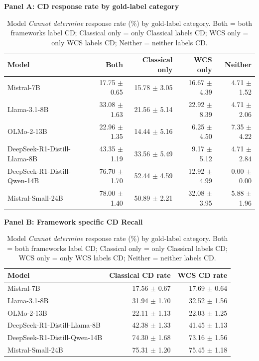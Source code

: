 \begin{table}[H]
\centering
\setlength{\tabcolsep}{3pt}
\caption{Model \emph{Cannot determine} response rate (\%) by gold-label category. Both = both frameworks label CD; Classical only = only Classical labels CD; WCS only = only WCS labels CD; Neither = neither labels CD.}
\label{tab:cannot-determine-per-frameworks}
\textbf{Panel A: CD response rate by gold-label category}\\
\par\vspace{4pt}
\begin{tabular}{lrrrr}
\toprule
Model & Both & Classical only & WCS only & Neither \\
\midrule
Mistral-7B & 17.75 $\pm$ 0.65 & 15.78 $\pm$ 3.05 & 16.67 $\pm$ 4.39 & 4.71 $\pm$ 1.52 \\
Llama-3.1-8B & 33.08 $\pm$ 1.63 & 21.56 $\pm$ 5.14 & 22.92 $\pm$ 8.39 & 4.71 $\pm$ 2.06 \\
OLMo-2-13B & 22.96 $\pm$ 1.35 & 14.44 $\pm$ 5.16 & 6.25 $\pm$ 4.50 & 7.35 $\pm$ 4.22 \\
DeepSeek-R1-Distill-Llama-8B & 43.35 $\pm$ 1.19 & 33.56 $\pm$ 5.49 & 9.17 $\pm$ 5.12 & 4.71 $\pm$ 2.84 \\
DeepSeek-R1-Distill-Qwen-14B & 76.70 $\pm$ 1.70 & 52.44 $\pm$ 4.59 & 12.92 $\pm$ 4.99 & 0.00 $\pm$ 0.00 \\
Mistral-Small-24B & 78.00 $\pm$ 1.40 & 50.89 $\pm$ 2.21 & 32.08 $\pm$ 3.95 & 5.88 $\pm$ 1.96 \\
\bottomrule
\end{tabular}
\vspace{4pt}

\textbf{Panel B: Framework specific CD Recall}\\
\par\vspace{4pt}
\begin{tabular}{lrr}
\toprule
Model & Classical CD rate & WCS CD rate \\
\midrule
Mistral-7B & 17.56 $\pm$ 0.67 & 17.69 $\pm$ 0.64 \\
Llama-3.1-8B & 31.94 $\pm$ 1.70 & 32.52 $\pm$ 1.56 \\
OLMo-2-13B & 22.11 $\pm$ 1.13 & 22.03 $\pm$ 1.25 \\
DeepSeek-R1-Distill-Llama-8B & 42.38 $\pm$ 1.33 & 41.45 $\pm$ 1.13 \\
DeepSeek-R1-Distill-Qwen-14B & 74.30 $\pm$ 1.68 & 73.16 $\pm$ 1.56 \\
Mistral-Small-24B & 75.31 $\pm$ 1.20 & 75.45 $\pm$ 1.18 \\
\bottomrule
\end{tabular}
\end{table}
